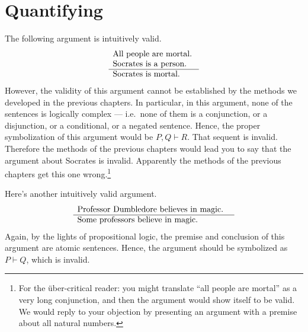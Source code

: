 \chapter{Quantifying}

The following argument is  intuitively valid.
\[ \begin{array}{p{3.5cm}}
    All people are mortal. \\
    Socrates is a person. \\ \hline Socrates is mortal. \end{array} \]
However, the validity of this argument cannot be established by the
methods we developed in the previous chapters.  In particular, in this
argument, none of the sentences is logically complex --- i.e.\ none of
them is a conjunction, or a disjunction, or a conditional, or a
negated sentence.  Hence, the proper symbolization of this argument
would be $P,Q\vdash R$.  That sequent is invalid.  Therefore the
methods of the previous chapters would lead you to say that the
argument about Socrates is invalid.  Apparently the methods of the
previous chapters get this one wrong.\footnote{For the \"uber-critical
  reader: you might translate ``all people are mortal'' as a very long
  conjunction, and then the argument would show itself to be valid.
  We would reply to your objection by presenting an argument with a
  premise about all natural numbers.}

Here's another intuitively valid argument.
\[ \begin{array}{p{6.5cm}} Professor Dumbledore believes in magic.  \\
    \hline Some professors believe in magic.  \end{array} \] Again, by
the lights of propositional logic, the premise and conclusion of this
argument are \glspl{atomic sentence}.  Hence, the argument should be
symbolized as $P\vdash Q$, which is invalid.

